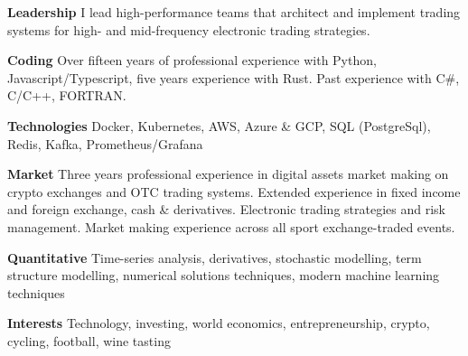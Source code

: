 {\bf Leadership} I lead high-performance teams that architect and implement trading systems for high- and mid-frequency electronic trading strategies.

{\bf Coding} Over fifteen years of professional experience with Python, Javascript/Typescript, five years experience with Rust.
Past experience with C\#, C/C++, FORTRAN.

{\bf Technologies} Docker, Kubernetes, AWS, Azure \& GCP, SQL (PostgreSql), Redis, Kafka, Prometheus/Grafana

{\bf Market} Three years professional experience in digital assets market making on crypto exchanges and OTC trading systems.
Extended experience in fixed income and foreign exchange, cash \& derivatives.
Electronic trading strategies and risk management.
Market making experience across all sport exchange-traded events.

{\bf Quantitative} Time-series analysis, derivatives, stochastic modelling, term structure modelling, numerical solutions techniques, modern machine learning techniques

{\bf Interests} Technology, investing, world economics, entrepreneurship, crypto, cycling, football, wine tasting
